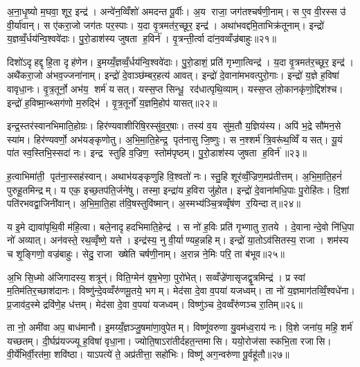 अ॒ना॒धृ॒ष्यो म॒घवा॒ शूर॒ इन्द्र॑। अन्वे॑न॒व्विँशो॑ अमदन्त पू॒र्वीः। अ॒य राजा॒ जग॑तश्चर्\mbox{}षणी॒नाम्। स ए॒व वी॒रस्स उ॑ वी॒र्या॑वान्। स ए॑करा॒जो जग॑तः पर॒स्पाः। य॒दा वृ॒त्रमत॑र॒च्छूर॒ इन्द्र॑। अथा॑भवद्दमि॒ताभिक्र॑तूनाम्। इन्द्रो॑ य॒ज्ञव्वँ॒र्धय॑न्वि॒श्ववे॑दाः। पु॒रो॒डाश॑स्य जुषता ह॒विर्न॑। वृ॒त्रन्ती॒र्त्वा दा॑न॒वव्वँज्र॑बाहुः॥२१॥

दिशो॑ऽदृहद्दृहि॒ता दृह॑णेन। इ॒मय्यँ॒ज्ञव्वँ॒र्धय॑न्वि॒श्ववे॑दाः। पु॒रो॒डाशं॒ प्रति॑ गृभ्णा॒त्विन्द्र॑। य॒दा वृ॒त्रमत॑र॒च्छूर॒ इन्द्र॑। अथै॑करा॒जो अ॑भव॒ज्जना॑नाम्। इन्द्रो॑ दे॒वाञ्छ॑म्बर॒हत्य॑ आवत्। इन्द्रो॑ दे॒वाना॑मभवत्पुरो॒गाः। इन्द्रो॑ य॒ज्ञे ह॒विषा॑ वावृधा॒नः। वृ॒त्र॒तूर्नो॒ अभ॑य॒ शर्म॑ यसत्। यस्स॒प्त सिन्धू॒ रद॑धात्पृथि॒व्याम्। यस्स॒प्त लो॒कानकृ॑णो॒द्दिश॑श्च। इन्द्रो॑ ह॒विष्मा॒न्थ्सग॑णो म॒रुद्भि॑। वृ॒त्र॒तूर्नो॑ य॒ज्ञमि॒होप॑ यासत्॥२२॥\anuvakamend[व॒व॒र्थ॒ वि॒थ्स॒ इन्द्र॑स्तु॒रायास्तु वृत्र॒तूर्ये॒ वज्र॑बाहुः पृथि॒व्यान्त्रीणि॑ च]

इन्द्र॒स्तर॑स्वानभिमाति॒होग्रः। हिर॑ण्यवाशीरिषि॒रस्सु॑व॒र्॒षाः। तस्य॑ व॒य सु॑म॒तौ य॒ज्ञिय॑स्य। अपि॑ भ॒द्रे सौ॑मन॒से स्या॑म। हिर॑ण्यवर्णो॒ अभ॑यङ्कृणोतु। अ॒भि॒मा॒ति॒हेन्द्र॒ पृत॑नासु जि॒ष्णुः। स न॒श्शर्म॑ त्रि॒वरू॑थ॒व्विँ यसत्। यू॒यं पा॑त स्व॒स्तिभि॒स्सदा॑ नः। इन्द्र स्तुहि व॒ज्रिण॒ स्तोम॑पृष्ठम्। पु॒रो॒डाश॑स्य जुषता ह॒विर्न॑॥२३॥

ह॒त्वाभिमा॑ती॒ पृत॑ना॒स्सह॑स्वान्। अथाभ॑यङ्कृणुहि वि॒श्वतो॑ नः। स्तु॒हि शूर॑व्वँ॒ज्रिण॒मप्र॑तीत्तम्। अ॒भि॒मा॒ति॒हनं॑ पुरुहू॒तमिन्द्रम्। य एक॒ इच्छ॒तप॑ति॒र्जने॑षु। तस्मा॒ इन्द्रा॑य ह॒विरा जु॑होत। इन्द्रो॑ दे॒वाना॑मधि॒पाः पु॒रोहि॑तः। दि॒शां पति॑रभवद्वा॒जिनी॑वान्। अ॒भि॒मा॒ति॒हा त॑वि॒षस्तुवि॑ष्मान्। अ॒स्मभ्य॑ञ्चि॒त्रव्वृँष॑ण र॒यिन्दात्॥२४॥

य इ॒मे द्यावा॑पृथि॒वी म॑हि॒त्वा। बले॒नादृहदभिमाति॒हेन्द्र॑। स नो॑ ह॒विः प्रति॑ गृभ्णातु रा॒तये। दे॒वानान्दे॒वो नि॑धि॒पा नो॑ अव्यात्। अन॑वस्ते॒ रथ॒व्वृँष्णे॒ यत्ते। इन्द्र॑स्य॒ नु वी॒र्याण्यह॒न्नहिम्। इन्द्रो॑ या॒तोऽव॑सितस्य॒ राजा। शम॑स्य च शृ॒ङ्गिणो॒ वज्र॑बाहुः। सेदु॒ राजा ख्षेति चर्\mbox{}षणी॒नाम्। अ॒रान्न ने॒मिः परि॒ ता ब॑भूव॥२५॥

अ॒भि सि॒ध्मो अ॑जिगादस्य॒ शत्रून्॑। विति॒ग्मेन॑ वृष॒भेणा॒ पुरो॑भेत्। सव्वँज्रे॑णासृजद्वृ॒त्रमिन्द्र॑। प्र स्वां म॒तिम॑तिर॒च्छाश॑दानः। विष्णु॑न्दे॒वव्वँरु॑णमू॒तये॒ भगम्। मेद॑सा दे॒वा व॒पया॑ यजध्वम्। ता नो॑ य॒ज्ञमाग॑तव्विँ॒श्वधे॑ना। प्र॒जाव॑द॒स्मे द्रवि॑णे॒ह ध॑त्तम्। मेद॑सा दे॒वा व॒पया॑ यजध्वम्। विष्णु॑ञ्च दे॒वव्वँरु॑णञ्च रा॒तिम्॥२६॥

ता नो॒ अमी॑वा अप॒ बाध॑मानौ। इ॒मय्यँ॒ज्ञञ्जु॒षमा॑णा॒वुपेतम्। विष्णू॑वरुणा यु॒वम॑ध्व॒राय॑ नः। वि॒शे जना॑य॒ महि॒ शर्म॑ यच्छतम्। दी॒र्घप्र॑यज्ज्यू ह॒विषा॑ वृधा॒ना। ज्योति॒षाऽरा॑तीर्दहत॒न्तमासि। ययो॒रोज॑सा स्कभि॒ता रजासि। वी॒र्ये॑भिर्वी॒रत॑मा॒ शवि॑ष्ठा। याऽपत्ये॑ ते॒ अप्र॑तीत्ता॒ सहो॑भिः। विष्णू॑ अग॒न्वरु॑णा पू॒र्वहू॑तौ॥२७॥

